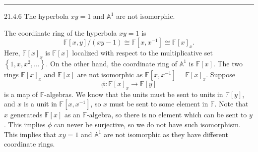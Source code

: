 \documentclass[letterpaper, 12pt]{article}
\begin{document}
\noindent\rule{7in}{2.8pt}
\begin{problem}{21.4.6}
The hyperbola \(xy=1\) and \(\mathbb{A}^1\) are not isomorphic.
\end{problem}
\begin{solution}
The coordinate ring of the hyperbola \(xy=1\) is 
\[\mathbb{F}[x,y]/(xy-1)\cong \mathbb{F}[x,x^{-1}]\cong \mathbb{F}[x]_x.\]
Here, \(\mathbb{F}[x]_x\) is \(\mathbb{F}[x]\) localized with respect to the multiplicative set \(\left\{ 1,x,x^2,\ldots \right\}\). On the other hand, the coordinate ring of \(\mathbb{A}^1\) is \(\mathbb{F}[x]\). The two rings \(\mathbb{F}[x]_x\) and \(\mathbb{F}[x]\) are not isomorphic as \(\mathbb{F}[x,x^{-1}]=\mathbb{F}[x]_x\). Suppose 
\[\phi:\mathbb{F}[x]_x\rightarrow \mathbb{F}[y]\]
is a map of \(\mathbb{F}\)-algebras. We know that the units must be sent to units in \(\mathbb{F}[y]\), and \(x\) is a unit in \(\mathbb{F}[x,x^{-1}]\), so \(x\) must be sent to some element in \(\mathbb{F}\). Note that \(x\) generateds \(\mathbb{F}[x]\) as an \(\mathbb{F}\)-algebra, so there is no element which can be sent to \(y\). This implies \(\phi\) can never be surjective, so we do not have such isomorphism. This implies that \(xy=1\) and \(\mathbb{A}^1\) are not isomorphic as they have different coordinate rings.
\end{solution}
\end{document}
